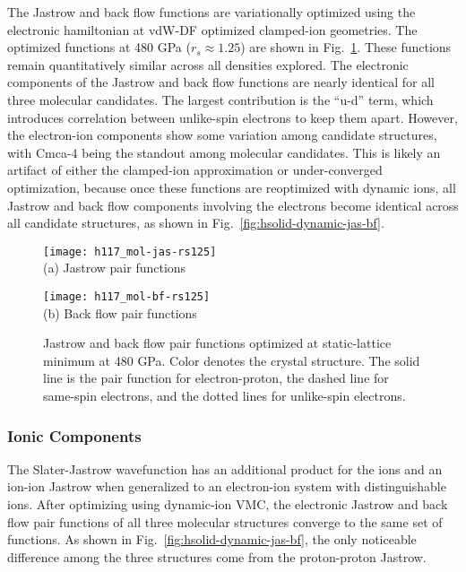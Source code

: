 The Jastrow and back flow functions are variationally optimized using the electronic hamiltonian at vdW-DF optimized clamped-ion geometries. The optimized functions at 480 GPa ($r_s\approx 1.25$) are shown in Fig.~\ref{fig:hsolid-static-jas-bf}.
These functions remain quantitatively similar across all densities explored.
The electronic components of the Jastrow and back flow functions are nearly identical for all three molecular candidates.
The largest contribution is the ``u-d'' term, which introduces correlation between unlike-spin electrons to keep them apart.
However, the electron-ion components show some variation among candidate structures, with Cmca-4 being the standout among molecular candidates.
This is likely an artifact of either the clamped-ion approximation or under-converged optimization, because once these functions are reoptimized with dynamic ions, all Jastrow and back flow components involving the electrons become identical across all candidate structures, as shown in Fig.~\ref{fig:hsolid-dynamic-jas-bf}.

\begin{figure}[h]
\centering
\begin{minipage}{0.49\textwidth}
\centering
\texttt{[image: h117\_mol-jas-rs125]}\\
(a) Jastrow pair functions
\end{minipage}
\begin{minipage}{0.49\textwidth}
\centering
\texttt{[image: h117\_mol-bf-rs125]}\\
(b) Back flow pair functions
\end{minipage}
\caption{Jastrow and back flow pair functions optimized at static-lattice minimum at 480 GPa. Color denotes the crystal structure. The solid line is the pair function for electron-proton, the dashed line for same-spin electrons, and the dotted lines for unlike-spin electrons.}
\label{fig:hsolid-static-jas-bf}
\end{figure}

\subsubsection{Ionic Components}
The Slater-Jastrow wavefunction has an additional product for the ions and an ion-ion Jastrow when generalized to an electron-ion system with distinguishable ions.
After optimizing using dynamic-ion VMC, the electronic Jastrow and back flow pair functions of all three molecular structures converge to the same set of functions.
As shown in Fig.~\ref{fig:hsolid-dynamic-jas-bf}, the only noticeable difference among the three structures come from the proton-proton Jastrow.

